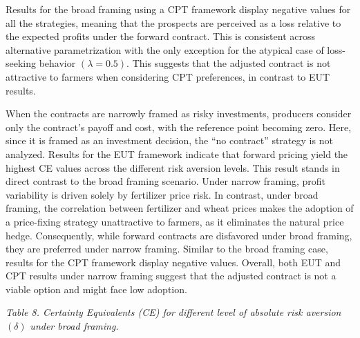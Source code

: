 \documentclass[
]{article}
\begin{document}
Results for the broad framing using a CPT framework display negative
values for all the strategies, meaning that the prospects are perceived
as a loss relative to the expected profits under the forward contract.
This is consistent across alternative parametrization with the only
exception for the atypical case of loss-seeking behavior
\((\lambda = 0.5)\). This suggests that the adjusted contract is not
attractive to farmers when considering CPT preferences, in contrast to
EUT results.

When the contracts are narrowly framed as risky investments, producers
consider only the contract's payoff and cost, with the reference point
becoming zero. Here, since it is framed as an investment decision, the
``no contract'' strategy is not analyzed. Results for the EUT framework
indicate that forward pricing yield the highest CE values across the
different risk aversion levels. This result stands in direct contrast to
the broad framing scenario. Under narrow framing, profit variability is
driven solely by fertilizer price risk. In contrast, under broad
framing, the correlation between fertilizer and wheat prices makes the
adoption of a price-fixing strategy unattractive to farmers, as it
eliminates the natural price hedge. Consequently, while forward
contracts are disfavored under broad framing, they are preferred under
narrow framing. Similar to the broad framing case, results for the CPT
framework display negative values. Overall, both EUT and CPT results
under narrow framing suggest that the adjusted contract is not a viable
option and might face low adoption.

\protect{}\label{_Ref216184323}{}\emph{Table 8. Certainty
Equivalents (CE) for different level of absolute risk aversion}
\((\delta)\) \emph{under broad framing.}
\end{document}
